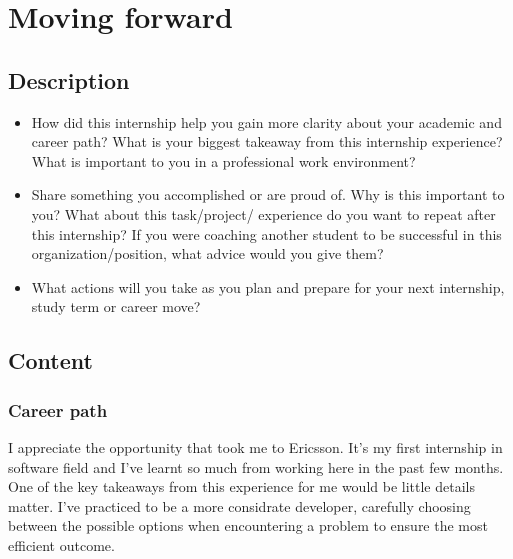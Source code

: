 \newpage
\section{Moving forward}

\subsection{Description}

\begin{itemize}
    \item How did this internship help you gain more clarity about your academic and career path? What is your biggest takeaway from this internship experience? What is important to you in a professional work environment?
    \item Share something you accomplished or are proud of. Why is this important to you? What about this task/project/ experience do you want to repeat after this internship? If you were coaching another student to be successful in this organization/position, what advice would you give them?
    \item What actions will you take as you plan and prepare for your next internship, study term or career move? 
\end{itemize}


\subsection{Content}

\subsubsection{Career path}
I appreciate the opportunity that took me to Ericsson. 
It's my first internship in software field and I've learnt so much from working here in the past few months.
One of the key takeaways from this experience for me would be little details matter.
I've practiced to be a more considrate developer, carefully choosing between the possible options when encountering a problem to ensure the most efficient outcome.


